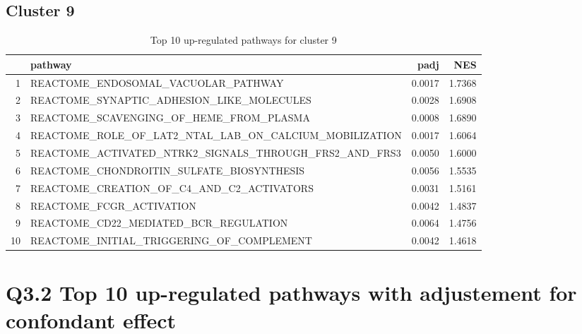 \documentclass{article}
\begin{document}
\subsection{Cluster 9 }
\begin{table}[H]
\centering
\begin{tabularx}{\textwidth}{rlrr}
  \hline
 & pathway & padj & NES \\ 
  \hline
1 & REACTOME\_ENDOSOMAL\_VACUOLAR\_PATHWAY & 0.0017 & 1.7368 \\ 
  2 & REACTOME\_SYNAPTIC\_ADHESION\_LIKE\_MOLECULES & 0.0028 & 1.6908 \\ 
  3 & REACTOME\_SCAVENGING\_OF\_HEME\_FROM\_PLASMA & 0.0008 & 1.6890 \\ 
  4 & REACTOME\_ROLE\_OF\_LAT2\_NTAL\_LAB\_ON\_CALCIUM\_MOBILIZATION & 0.0017 & 1.6064 \\ 
  5 & REACTOME\_ACTIVATED\_NTRK2\_SIGNALS\_THROUGH\_FRS2\_AND\_FRS3 & 0.0050 & 1.6000 \\ 
  6 & REACTOME\_CHONDROITIN\_SULFATE\_BIOSYNTHESIS & 0.0056 & 1.5535 \\ 
  7 & REACTOME\_CREATION\_OF\_C4\_AND\_C2\_ACTIVATORS & 0.0031 & 1.5161 \\ 
  8 & REACTOME\_FCGR\_ACTIVATION & 0.0042 & 1.4837 \\ 
  9 & REACTOME\_CD22\_MEDIATED\_BCR\_REGULATION & 0.0064 & 1.4756 \\ 
  10 & REACTOME\_INITIAL\_TRIGGERING\_OF\_COMPLEMENT & 0.0042 & 1.4618 \\ 
   \hline
\end{tabularx}
\caption{Top 10 up-regulated pathways for cluster 9} 
\label{tab:q3_2_9}
\end{table}
\section{Q3.2 Top 10 up-regulated pathways with adjustement for confondant effect}
\end{document}
